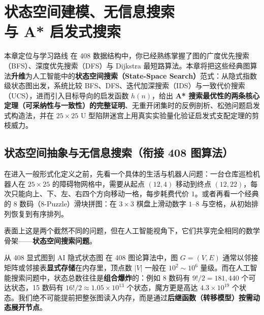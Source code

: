 \chapter[状态空间搜索与 A* 启发式算法]{状态空间建模、无信息搜索\\与 A* 启发式搜索}\label{ch:search}

\begin{chapIntro}{本章定位与学习路线}
在 408 数据结构中，你已经熟练掌握了图的广度优先搜索（BFS）、深度优先搜索（DFS）与 Dijkstra 最短路算法。本章将把这些经典图算法\textbf{升维}为人工智能中的\textbf{状态空间搜索（State-Space Search）}范式：从隐式指数级状态图出发，系统比较 BFS、DFS、迭代加深搜索（IDS）与一致代价搜索（UCS），进而引入目标导向的启发函数 $h(n)$，给出 \textbf{A* 搜索最优性的两条核心定理（可采纳性与一致性）的完整证明}、无重开闭集时的反例剖析、松弛问题启发式构造法，并在 $25\times 25$ U 型陷阱迷宫上用真实实验量化验证启发式支配定理的剪枝威力。
\end{chapIntro}

\section{状态空间抽象与无信息搜索（衔接 408 图算法）}\label{sec:uninformed}

在进入一般形式化定义之前，先看一个具体的生活与机器人问题：一台仓库巡检机器人在 $25\times 25$ 的障碍物网格中，需要从起点 $(12,4)$ 移动到终点 $(12,22)$，每次只能向上、下、左、右四个方向移动一格，每步耗费代价 $1$。或者再看一个经典的 8 数码（8-Puzzle）滑块拼图：在 $3\times 3$ 棋盘上滑动数字 $1\text{--}8$ 与空格，从初始排列恢复到有序排列。

表面上这是两个截然不同的问题，但在人工智能视角下，它们共享完全相同的数学骨架——\textbf{状态空间搜索问题}。

\begin{recallBox}{从 408 显式图到 AI 隐式状态图}
在 408 图论算法中，图 $G=(V,E)$ 通常以邻接矩阵或邻接表\textbf{显式存储}在内存里，顶点数 $|V|$ 一般在 $10^2\sim 10^6$ 量级。而在人工智能搜索问题中，状态总数往往是\textbf{组合爆炸}的：例如 8 数码有 $9!/2 = 181{,}440$ 个可达状态，15 数码有 $16!/2 \approx 1.05\times 10^{13}$ 个状态，魔方更是高达 $4.3\times 10^{19}$ 个状态。我们绝不可能提前把整张图读入内存，而是通过\textbf{后继函数（转移模型）按需动态展开节点}。
\end{recallBox}

